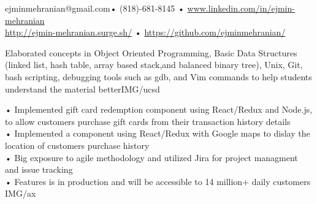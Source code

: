 \documentclass[paper=a4,fontsize=11pt]{temp} %
\begin{document}
\begin{minipage}{1.0\linewidth}
   
   
    ejminmehranian@gmail.com\hspace{0.5cm}• \hspace{0.5cm} (818)-681-8145 \hspace{0.5cm} • \hspace{0.5cm} \url {www.linkedin.com/in/ejmin-mehranian} \\ \url{http://ejmin-mehranian.surge.sh/} \hspace{0.41cm}• \hspace{0.6cm} \url{https://github.com/ejminmehranian/}
 
\end{minipage}

\noindent


{Elaborated concepts in Object Oriented Programming, Basic Data Structures (linked list, hash table, array based stack,and balanced binary tree), Unix, Git, bash scripting, debugging tools such as gdb, and Vim commands to help students understand the material better}{IMG/ucsd}

\noindent

{• Implemented gift card redemption component using React/Redux and Node.js, to allow customers purchase gift cards from their transaction history details
\\ • Implemented a component using React/Redux with Google maps to dislay the location of customers purchase history
\\ • Big exposure to agile methodology and utilized Jira for project managment and issue tracking
\\ • Features is in production and will be accessible to 14 million+ daily customers
} {IMG/ax}
\end{document}
